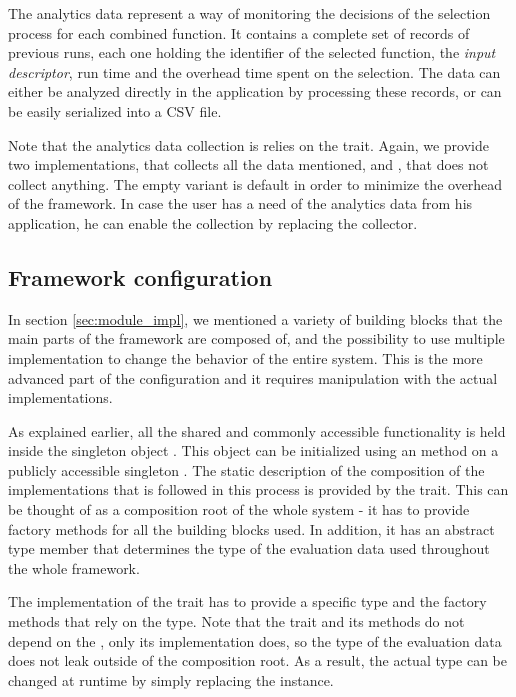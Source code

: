 The analytics data represent a way of monitoring the decisions of the selection process for each combined function. It contains a complete set of records of previous runs, each one holding the identifier of the selected function, the \textit{input descriptor}, run time and the overhead time spent on the selection. The data can either be analyzed directly in the application by processing these records, or can be easily serialized into a CSV file.

Note that the analytics data collection is relies on the  trait. Again, we provide two implementations,  that collects all the data mentioned, and , that does not collect anything. The empty variant is default in order to minimize the overhead of the framework. In case the user has a need of the analytics data from his application, he can enable the collection by replacing the collector.

\subsection{Framework configuration}
\label{subsec:framework_config}

In section \ref{sec:module_impl}, we mentioned a variety of building blocks that the main parts of the framework are composed of, and the possibility to use multiple implementation to change the behavior of the entire system. This is the more advanced part of the configuration and it requires manipulation with the actual implementations.

As explained earlier, all the shared and commonly accessible functionality is held inside the singleton object . This object can be initialized using an  method on a publicly accessible singleton . The static description of the composition of the implementations that is followed in this process is provided by the  trait. This can be thought of as a composition root of the whole system - it has to provide factory methods for all the building blocks used. In addition, it has an abstract type member  that determines the type of the evaluation data used throughout the whole framework.


The implementation of the  trait has to provide a specific  type and the factory methods that rely on the type. Note that the  trait and its methods do not depend on the , only its implementation does, so the type of the evaluation data does not leak outside of the composition root. As a result, the actual type can be changed at runtime by simply replacing the  instance.

